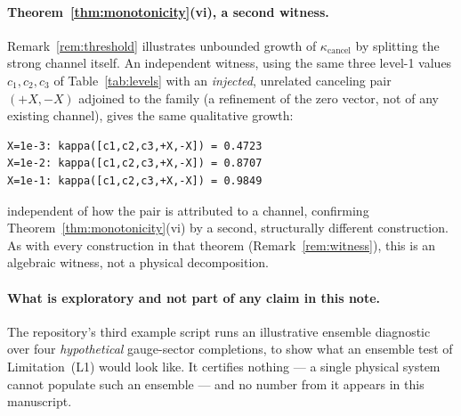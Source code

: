 \documentclass[11pt]{article}
\theoremstyle{definition}
\theoremstyle{remark}
\newcommand{\kcancel}{\kappa_{\mathrm{cancel}}}
\begin{document}
\paragraph{Theorem~\ref{thm:monotonicity}(vi), a second witness.} Remark~\ref{rem:threshold}
illustrates unbounded growth of $\kcancel$ by splitting the strong channel itself. An independent
witness, using the same three level-1 values $c_1,c_2,c_3$ of Table~\ref{tab:levels} with an
\emph{injected}, unrelated canceling pair $(+X,-X)$ adjoined to the family (a refinement of the
zero vector, not of any existing channel), gives the same qualitative growth:
\begingroup\small
\begin{verbatim}
X=1e-3: kappa([c1,c2,c3,+X,-X]) = 0.4723
X=1e-2: kappa([c1,c2,c3,+X,-X]) = 0.8707
X=1e-1: kappa([c1,c2,c3,+X,-X]) = 0.9849
\end{verbatim}
\endgroup
independent of how the pair is attributed to a channel, confirming Theorem~\ref{thm:monotonicity}(vi)
by a second, structurally different construction. As with every construction in that theorem
(Remark~\ref{rem:witness}), this is an algebraic witness, not a physical decomposition.

\paragraph{What is exploratory and not part of any claim in this note.} The repository's third
example script runs an illustrative ensemble diagnostic over four \emph{hypothetical} gauge-sector
completions, to show what an ensemble test of Limitation~(L1) would look like. It certifies
nothing --- a single physical system cannot populate such an ensemble --- and no number from it
appears in this manuscript.



\end{document}
